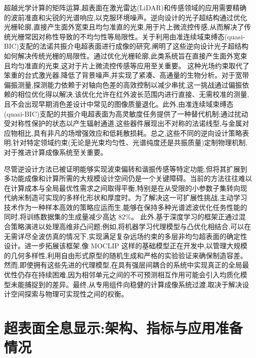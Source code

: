 \documentclass[11pt]{article}
\begin{document}
超越光学计算的矩阵运算,超表面在激光雷达(LiDAR)和传感领域的应用需要精确的波前准直和尖锐的光谱响应,以克服环境噪声。逆向设计的光子超结构通过优化光栅轮廓,直接产生面外宽束且均匀准直的光束,用于片上微流控传感,从而解决了传统光栅常因对称性导致的不均匀性等局限性。关于利用由准连续域束缚态(quasi-BIC)支配的法诺共振介电超表面进行成像的研究,阐明了这些逆向设计光子超结构如何解决传统光栅的局限性。通过优化光栅轮廓,此类系统旨在直接产生面外宽束且均匀准直的光束,这对于片上微流控传感等应用至关重要。\citep{s2_42f2fcc893f3a45ac750a8ffe67752f8533c0c61_58d9419c} 这种光场约束取代了笨重的台式激光器,降低了背景噪声,并实现了紧凑、高通量的生物分析。对于宽带偏振测量,探测能力依赖于对轴向色差的高效控制以减少串扰,这一挑战通过偏振依赖的相位优化得以解决,该优化允许在红外波长范围内进行直接、无需校准的测量,且不会出现早期消色差设计中常见的图像质量退化。此外,由准连续域束缚态(quasi-BIC)支配的共振介电超表面为高灵敏度任务提供了一种替代机制;通过扰动受对称性保护的状态以产生辐射通道,这些器件展现出不对称的法诺线型,与金属对应物相比,具有非凡的场增强效应和低耗散损耗。总之,这些不同的逆向设计策略表明,针对特定领域约束(无论是光束均匀性、光谱纯度还是共振质量)定制物理机制,对于推进计算成像系统至关重要。\citep{doi_10_1038_s41598_021_84841_2_2ce5ab57} \citep{doi_10_29026_oea_2022_220058_79ee78ee} \citep{s2_42f2fcc893f3a45ac750a8ffe67752f8533c0c61_58d9419c}

尽管逆设计方法已被证明能够实现波束偏转和谐振传感等特定功能,但将其扩展到多功能成像和计算所需的大规模设计空间仍是一个关键障碍。当前的方法往往难以在计算成本与全局最优性需求之间取得平衡,特别是在从受限的小参数子集转向现代纳米制造可实现的多样化形状和厚度时。为了解决这一可扩展性挑战,主动学习技术作为一种样本高效的策略应运而生,能够在保持多种光谱滤波优化任务性能的同时,将训练数据集的生成量减少高达 82\%。\citep{doi_10_1364_oe_559669_898a2205} 此外,基于深度学习的框架正通过混合策略演进以处理高维非凸问题;例如,将机器学习代理模型与凸优化相结合,可以在无需详尽全波仿真的情况下,实现满足复杂远场约束的多层非均匀超表面的确定性设计。进一步拓展该框架,像 MOCLIP 这样的基础模型正在开发中,以管理大规模的几何多样性,利用自由形式原型的随机生成和严格的实验验证来确保制造容差。然而,即使拥有这些先进的代理模型,在具有强层间耦合的系统中实现真正的全局最优性仍存在持续困难,因为相邻单元之间的不可预测相互作用可能会引入均质化模型未能捕捉到的差异。最终,从专用组件向稳健的计算成像系统过渡,取决于解决设计空间探索与物理可实现性之间的权衡。\citep{doi_10_1364_oe_559669_898a2205} \citep{doi_10_1038_s41467_026_76714_x_8ca5d39b} \citep{doi_10_1109_tap_2021_3137496_d4a1d597}

\section{超表面全息显示:架构、指标与应用准备情况}\label{ux8d85ux8868ux9762ux5168ux606fux663eux793aux67b6ux6784ux6307ux6807ux4e0eux5e94ux7528ux51c6ux5907ux60c5ux51b5}
\end{document}
